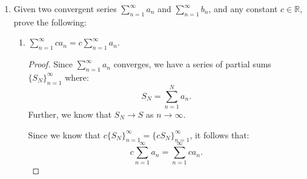 \documentclass[12pt]{amsart}
\begin{document}
\begin{enumerate}
\medskip

\noindent Hint:  Use induction and the fact that $\frac{1}{n(n+1)}=\frac{1}{n}-\frac{1}{n+1}$ 
to find the partial sums.

\begin{proof}
Let $\{S_N\}_{n=1}^\infty$ be the series of partial sums where $S_N = \sum_{n=1}^N  \frac{1}{n(n+1)}$. We want to show that $S_N \to S$ as $n\to\infty$.

I claim that:
\[ S_N = 1 - \frac 1 {N+1}. \]
We will proceed by induction. When $N=1$, then we have:
\[ \frac 1 {1\cdot(1+1)} = 1- \frac 1 {1+1} = \frac 1 2. \]
Suppose that $S_k = 1 - \frac 1 {k+1}$, we want to show that $S_{k+1} = 1 - \frac 1 {k+2}$. We have that $S_k = 1 - \frac 1 {k+1}$, so $S_{k+1}$ must equal $1 - \frac 1 {k+1} + \frac 1 {(k+1)(k+2)}$. But since we can write $\frac{1}{n(n+1)}$ as $\frac{1}{n}-\frac{1}{n+1}$, we have the following:

\begin{align*}
S_{k+1} &= 1 - \frac 1 {k+1} + \frac 1 {(k+1)(k+2)} \\
&= 1 - \frac 1 {k+1} + \frac{1}{k+1}-\frac{1}{k+2} \\
&= 1- \frac{1}{k+2} \\
&= 1 - \frac 1 {(k+1) + 1}.
\end{align*}
Hence, our assertion that $S_N = 1 - \frac 1 {N+1}$ holds.
\end{proof}

\item Given two convergent series $\displaystyle
  \sum_{n=1}^\infty a_n$ and $\displaystyle \sum_{n=1}^\infty b_n$,
  and any constant $c\in \mathbb{R}$, prove the following:
\begin{enumerate}

\item $\displaystyle \sum_{n=1}^\infty ca_n = c\sum_{n=1}^\infty a_n$.

\begin{proof}
Since $\sum_{n=1}^\infty a_n$ converges, we have a series of partial sums $\{S_N\}_{n=1}^\infty$ where:
\[ S_N = \sum_{n=1}^N a_n. \]
Further, we know that $S_N \to S$ as $n \to \infty$.

Since we know that $c\{S_N\}_{n=1}^\infty = \{cS_N\}_{n=1}^\infty$, it follows that:
\[ c\sum_{n=1}^\infty a_n = \sum_{n=1}^\infty ca_n. \]

\end{proof}


\end{enumerate}
\end{enumerate}
\end{document}
